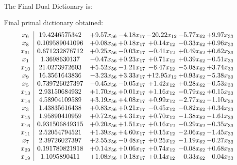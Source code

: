 \documentclass[8pt]{article}
\begin{document}
The Final Dual Dictionary is: 

 Final primal dictionary obtained: 
\[\begin{array}{c| c c@{\hskip 2pt} c@{\hskip 2pt} c@{\hskip 2pt} c@{\hskip 2pt} c@{\hskip 2pt} }
 x_{6}   &  19.4246575342 & +  9.57 x_{56} & -4.18 x_{17} & -20.22 x_{12} & -5.77 x_{62} & +  9.97 x_{33}\\
 x_{8}   &  0.109589041096 & +  0.08 x_{56} & +  0.18 x_{17} & +  0.14 x_{12} & -0.33 x_{62} & +  0.96 x_{33}\\
 x_{31}   &  0.671232876712 & +  0.25 x_{56} & -0.03 x_{17} & -0.41 x_{12} & +  0.49 x_{62} & +  0.62 x_{33}\\
 x_{1}   &  1.3698630137 & -0.47 x_{56} & +  0.23 x_{17} & +  0.71 x_{12} & +  0.39 x_{62} & -0.51 x_{33}\\
 x_{10}   &  21.0273972603 & +  5.52 x_{56} & -1.21 x_{17} & -6.47 x_{12} & -5.08 x_{62} & +  3.74 x_{33}\\
 x_{9}   &  16.3561643836 & -3.23 x_{56} & +  3.33 x_{17} & + 12.95 x_{12} & +  0.93 x_{62} & -5.38 x_{33}\\
 x_{5}   &  0.739726027397 & -0.45 x_{56} & -0.05 x_{17} & +  1.42 x_{12} & +  0.28 x_{62} & -0.53 x_{33}\\
 x_{13}   &  2.93150684932 & +  1.70 x_{56} & +  0.01 x_{17} & +  1.16 x_{12} & -0.79 x_{62} & +  0.15 x_{33}\\
 x_{14}   &  4.58904109589 & +  3.19 x_{56} & +  4.08 x_{17} & +  0.99 x_{12} & -2.77 x_{62} & -1.10 x_{33}\\
 x_{3}   &  1.43835616438 & +  0.83 x_{56} & +  0.21 x_{17} & -0.45 x_{12} & -0.82 x_{62} & +  0.34 x_{33}\\
 x_{15}   &  1.95890410959 & +  0.72 x_{56} & +  4.31 x_{17} & +  0.70 x_{12} & -1.38 x_{62} & -1.61 x_{33}\\
 x_{16}   &  0.931506849315 & +  0.20 x_{56} & +  1.51 x_{17} & +  0.16 x_{12} & -0.29 x_{62} & -0.35 x_{33}\\
 x_{11}   &  2.52054794521 & +  1.39 x_{56} & +  4.60 x_{17} & +  0.15 x_{12} & -2.06 x_{62} & -1.45 x_{33}\\
 x_{7}   &  2.39726027397 & +  2.55 x_{56} & -0.48 x_{17} & +  0.25 x_{12} & -1.19 x_{62} & -0.27 x_{33}\\
 x_{29}   &  0.191780821918 & +  0.14 x_{56} & +  0.06 x_{17} & +  0.74 x_{12} & -0.08 x_{62} & +  0.68 x_{33}\\
 x_{19}   &  1.1095890411 & +  1.08 x_{56} & +  0.18 x_{17} & +  0.14 x_{12} & -0.33 x_{62} & -0.04 x_{33}\\

\end{array}\]
\end{document}
